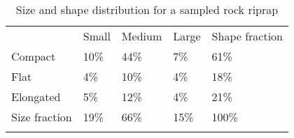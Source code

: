 \documentclass{ctexart}
\newcommand{\headcol}{\rowcolor{tableheadcolor}} %
\newcommand{\rowcol}{\rowcolor{tablerowcolor}} %
\newcommand{\topline}{\arrayrulecolor{black}\specialrule{0.1em}{\abovetopsep}{0pt}%
            \arrayrulecolor{tableheadcolor}\specialrule{\belowrulesep}{0pt}{0pt}%
            \arrayrulecolor{black}}
\newcommand{\bottomlinec}{\arrayrulecolor{tablerowcolor}\specialrule{\aboverulesep}{0pt}{0pt}%
            \arrayrulecolor{black}\specialrule{\heavyrulewidth}{0pt}{\belowbottomsep}}%
\newcommand{\rowmidlineHR}{\arrayrulecolor{tableheadcolor}
     \specialrule{\aboverulesep}{0pt}{0pt}%
     \arrayrulecolor{black}\specialrule{\lightrulewidth}{0pt}{0pt}%
     \arrayrulecolor{tablerowcolor}\specialrule{\belowrulesep}{0pt}{0pt}%
     \arrayrulecolor{black}}
\newcommand{\rowmidlineG}{\arrayrulecolor{tablerowcolor}%
     \specialrule{\aboverulesep}{0pt}{0pt}%
     \arrayrulecolor{blcolor}\specialrule{\lightrulewidth}{0pt}{0pt}%
     \arrayrulecolor{tablerowcolor}\specialrule{\belowrulesep}{0pt}{0pt}%
     \arrayrulecolor{black}}
\begin{document}
\maketitle
\large

\begin{table} [htpb]
\centering 
\centering
\caption{Size and shape distribution for a sampled rock riprap}
\label{tab:size_shape}
\begin{tabular} { p{}  p{} p{} p{} p{}  }
\topline
\headcol & Small  &  Medium &  Large & Shape fraction \\
\rowmidlineHR  %
\rowcol Compact    & 10\% &  44\% & 7\% & 61\% \\
\rowcol Flat       & 4\%  &  10\% & 4\% & 18\% \\
\rowcol Elongated  & 5\%  &  12\% & 4\% & 21\% \\
\rowmidlineG %
\rowcol Size fraction  & 19\% & 66\% & 15\% & 100\% \\
\bottomlinec
\end{tabular}
\end{table}
\end{document}
